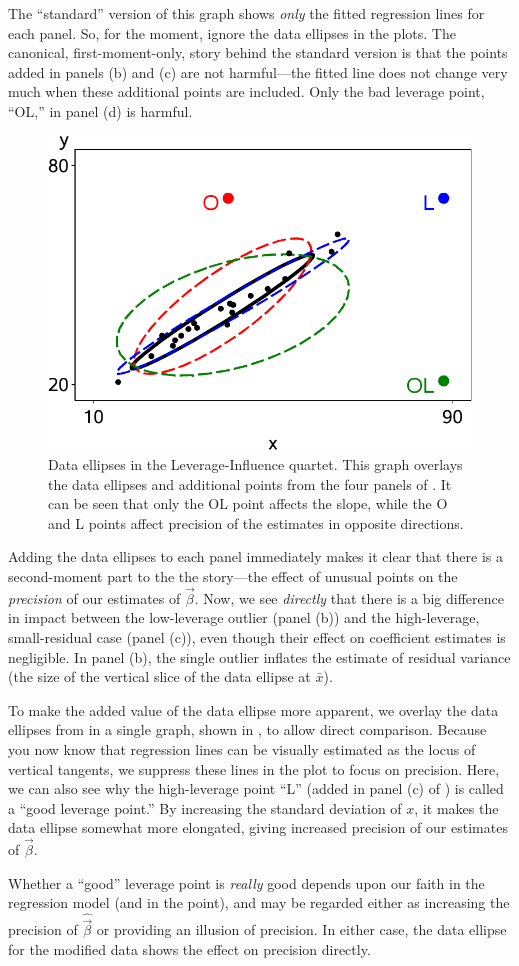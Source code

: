 The ``standard'' version of this graph shows \emph{only} the fitted regression lines for each
panel. So, for the moment, ignore the data ellipses in the plots.
The canonical, first-moment-only, story behind the standard version is that the points added in panels
(b) and (c) are not harmful---the fitted line does not change very much when these
additional points are included. Only the bad leverage point, ``OL,'' in panel (d) is harmful.

\begin{figure}[htb!]
  \centering
  \includegraphics[width=.5\textwidth,clip]{fig/levdemo22}
  \caption{Data ellipses in the Leverage-Influence quartet. This graph overlays the data ellipses
  and additional points from the four panels of . It can be seen that only the
  OL point affects the slope, while the O and L points affect precision of the estimates in opposite
  directions.}%
  \label{fig:levdemo22}
\end{figure}

Adding the data ellipses to each panel immediately makes it clear that there is a second-moment
part to the the story---the effect of unusual points on the \emph{precision} of our estimates
of $\vec{\beta}$.  Now,
we see \emph{directly} that there is a big difference in impact between
the low-leverage outlier (panel (b)) and the high-leverage, small-residual case (panel (c)),
even though their effect on coefficient estimates is negligible.
In panel (b), the single outlier inflates the estimate of residual variance (the size of the
vertical slice of the data ellipse at $\bar{x}$).

To make the added value of the data ellipse more apparent, we overlay the data ellipses from
 in a single graph, shown in
, to allow direct comparison.  Because you now know that regression lines
can be visually estimated as the locus of vertical tangents, we suppress these lines in the
plot to focus on precision.  Here, we can also see why the high-leverage
point ``L'' (added in panel (c) of ) is called a ``good leverage point.''
By increasing the standard deviation of $x$, it makes the data ellipse somewhat more elongated,
giving increased precision of our estimates of $\vec{\beta}$. 

Whether a ``good'' leverage point is \emph{really} good depends upon our faith in the regression model (and in the point), 
and may be regarded either as increasing the precision of $\hat{\vec{\beta}}$ or providing an illusion of precision.
In either case, the data ellipse for the modified data shows the effect on precision directly.

